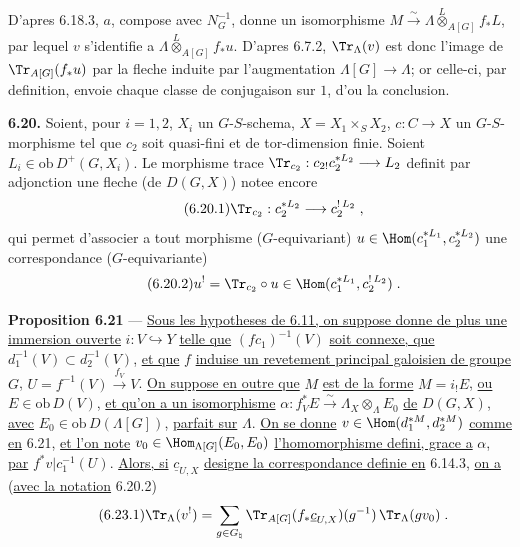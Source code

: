 D'apres 6.18.3, $a$, compose avec $N_G^{-1}$, donne un isomorphisme $M \xrightarrow{\sim} \Lambda \overset{L}{\otimes}_{A[G]} f_* L$, par lequel $v$ s'identifie a $\Lambda \overset{L}{\otimes}_{A[G]} f_* u$. D'apres 6.7.2, $\Tr_\Lambda(v)$ est donc l'image de $\Tr_{A[G]}(f_* u)$ par la fleche induite par l'augmentation $\Lambda[G] \longrightarrow \Lambda$; or celle-ci, par definition, envoie chaque classe de conjugaison sur $1$, d'ou la conclusion.


\medskip
\noindent\textbf{6.20.} Soient, pour $i = 1,2$, $X_i$ un $G$-$S$-schema, $X = X_1 \times_S X_2$, $c : C \longrightarrow X$ un $G$-$S$-morphisme tel que $c_2$ soit quasi-fini et de tor-dimension finie. Soient $L_i \in \mathrm{ob}\, D^+(G,X_i)$. Le morphisme trace $\Tr_{c_2} : c_{2!}c_2^{*L_2} \longrightarrow L_2$ definit par adjonction une fleche (de $D(G,X)$) notee encore
\begin{equation}\tag{6.20.1}
\Tr_{c_2} : c_2^{*L_2} \longrightarrow c_2^{!\,L_2}\;,
\end{equation}
qui permet d'associer a tout morphisme ($G$-equivariant) $u \in \Hom(c_1^{*L_1}, c_2^{*L_2})$ une correspondance ($G$-equivariante)
\begin{equation}\tag{6.20.2}
u^! = \Tr_{c_2} \circ u \in \Hom(c_1^{*L_1}, c_2^{!\,L_2})\;.
\end{equation}

\medskip
\noindent\textbf{Proposition 6.21} --- \underline{Sous les hypotheses de 6.11, on suppose donne de plus une immersion ouverte} $i : V \hookrightarrow Y$ \underline{telle que} $(fc_1)^{-1}(V)$ \underline{soit connexe, que} $d_1^{-1}(V) \subset d_2^{-1}(V)$, \underline{et que} $f$ \underline{induise un revetement principal galoisien de groupe} $G$, $U = f^{-1}(V) \xrightarrow{f_V} V$. \underline{On suppose en outre que} $M$ \underline{est de la forme} $M = i_!E$, \underline{ou} $E \in \mathrm{ob}\, D(V)$, \underline{et qu'on a un isomorphisme} $\alpha : f_V^*E \xrightarrow{\sim} \Lambda_X \otimes_\Lambda E_0$ \underline{de} $D(G,X)$, \underline{avec} $E_0 \in \mathrm{ob}\, D(\Lambda[G])$, \underline{parfait sur} $\Lambda$. \underline{On se donne} $v \in \Hom(d_1^{*M}, d_2^{*M})$ \underline{comme en} 6.21, \underline{et l'on note} $v_0 \in \Hom_{\Lambda[G]}(E_0, E_0)$ \underline{l'homomorphisme defini, grace a} $\alpha$, \underline{par} $f^* v|c_1^{-1}(U)$. \underline{Alors, si} $\underline{c}_{U,X}$ \underline{designe la correspondance definie en} 6.14.3, \underline{on a} (\underline{avec la notation} 6.20.2)
\begin{equation}\tag{6.23.1}
\Tr_\Lambda(v^!) = \sum_{g \in G_\natural} \Tr_{A[G]}(f_*\underline{c}_{U,X})(g^{-1})\,\Tr_\Lambda(gv_0)\;.
\end{equation}

